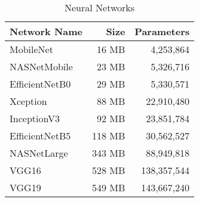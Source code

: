 \begin{table}[htb]
    \centering
    \begin{tabular}[htb]{ l  r  r }
        \hline
        Network Name   & Size    & Parameters  \\\hline
        MobileNet      & 16 MB   &   4,253,864 \\
        NASNetMobile   & 23 MB   &   5,326,716 \\
        EfficientNetB0 & 29 MB   &   5,330,571 \\
        Xception       & 88 MB   &  22,910,480 \\
        InceptionV3    & 92 MB   &  23,851,784 \\
        EfficientNetB5 & 118 MB  &  30,562,527 \\
        NASNetLarge    & 343 MB  &  88,949,818 \\
        VGG16          & 528 MB  & 138,357,544 \\
        VGG19          & 549 MB  & 143,667,240 \\\hline
    \end{tabular}
    \caption{Neural Networks}
    \label{tbl:nerual_networks}
\end{table}